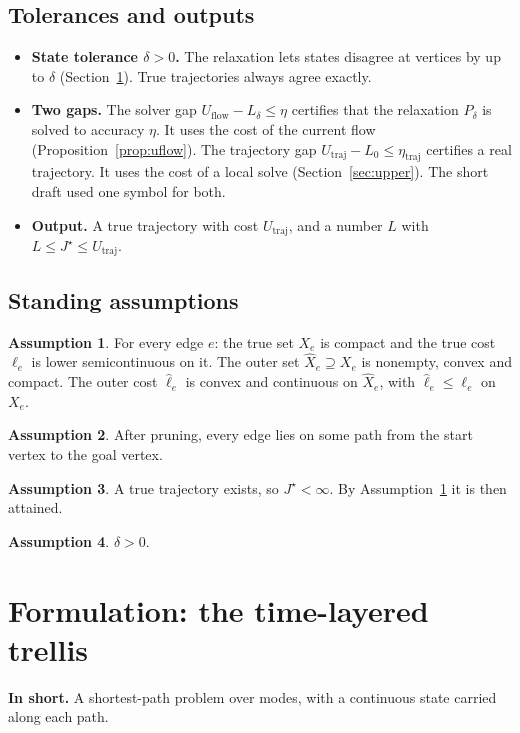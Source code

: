 \documentclass[11pt]{article}
\newcommand{\Pd}{P_\delta}
\newcommand{\Uflow}{U_{\mathrm{flow}}}
\newcommand{\Utraj}{U_{\mathrm{traj}}}
\newcommand{\inshort}[1]{\par\noindent\textcolor{accent}{\textbf{In short.}} #1\par\smallskip}
\theoremstyle{plain}
\theoremstyle{definition}
\newtheorem{assumption}{Assumption}
\theoremstyle{remark}
\begin{document}
\subsection{Tolerances and outputs}
\begin{itemize}[leftmargin=1.2em]
  \item \textbf{State tolerance $\delta>0$.} The relaxation lets states disagree at vertices by up to $\delta$ (Section~\ref{sec:form}). True trajectories always agree exactly.
  \item \textbf{Two gaps.} The solver gap $\Uflow-L_\delta\le\eta$ certifies that the relaxation $\Pd$ is solved to accuracy $\eta$. It uses the cost of the current flow (Proposition~\ref{prop:uflow}). The trajectory gap $\Utraj-L_0\le\eta_{\mathrm{traj}}$ certifies a real trajectory. It uses the cost of a local solve (Section~\ref{sec:upper}). The short draft used one symbol for both.
  \item \textbf{Output.} A true trajectory with cost $\Utraj$, and a number $L$ with $L\le J^\star\le\Utraj$.
\end{itemize}

\subsection{Standing assumptions}
\begin{assumption}\label{as:sets}
For every edge $e$: the true set $X_e$ is compact and the true cost $\ell_e$ is lower semicontinuous on it. The outer set $\hat X_e\supseteq X_e$ is nonempty, convex and compact. The outer cost $\hat\ell_e$ is convex and continuous on $\hat X_e$, with $\hat\ell_e\le\ell_e$ on $X_e$.
\end{assumption}
\begin{assumption}\label{as:paths}
After pruning, every edge lies on some path from the start vertex to the goal vertex.
\end{assumption}
\begin{assumption}\label{as:feas}
A true trajectory exists, so $J^\star<\infty$. By Assumption~\ref{as:sets} it is then attained.
\end{assumption}
\begin{assumption}\label{as:delta}
$\delta>0$.
\end{assumption}

\section{Formulation: the time-layered trellis}\label{sec:form}
\inshort{A shortest-path problem over modes, with a continuous state carried along each path.}
\end{document}
